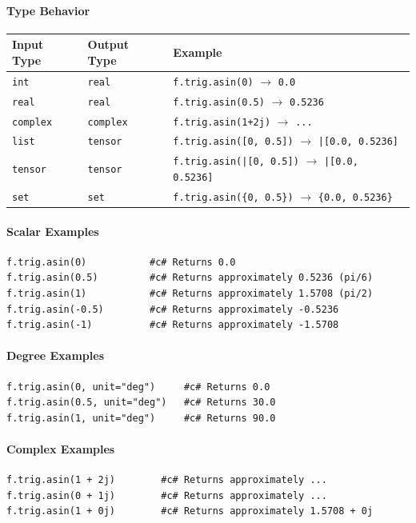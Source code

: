 \paragraph{Type Behavior}
\begin{center}
\begin{tabular}{lll}
\textbf{Input Type} & \textbf{Output Type} & \textbf{Example} \\ \hline
\texttt{int} & \texttt{real} & \texttt{f.trig.asin(0)} $\to$ \texttt{0.0} \\
\texttt{real} & \texttt{real} & \texttt{f.trig.asin(0.5)} $\to$ \texttt{0.5236} \\
\texttt{complex} & \texttt{complex} & \texttt{f.trig.asin(1+2j)} $\to$ \texttt{...} \\
\texttt{list} & \texttt{tensor} & \texttt{f.trig.asin([0, 0.5])} $\to$ \texttt{|[0.0, 0.5236]} \\
\texttt{tensor} & \texttt{tensor} & \texttt{f.trig.asin(|[0, 0.5])} $\to$ \texttt{|[0.0, 0.5236]} \\
\texttt{set} & \texttt{set} & \texttt{f.trig.asin(\{0, 0.5\})} $\to$ \texttt{\{0.0, 0.5236\}} \\
\end{tabular}
\end{center}

\paragraph{Scalar Examples}
\begin{verbatim}
f.trig.asin(0)           #c# Returns 0.0
f.trig.asin(0.5)         #c# Returns approximately 0.5236 (pi/6)
f.trig.asin(1)           #c# Returns approximately 1.5708 (pi/2)
f.trig.asin(-0.5)        #c# Returns approximately -0.5236
f.trig.asin(-1)          #c# Returns approximately -1.5708
\end{verbatim}

\paragraph{Degree Examples}
\begin{verbatim}
f.trig.asin(0, unit="deg")     #c# Returns 0.0
f.trig.asin(0.5, unit="deg")   #c# Returns 30.0
f.trig.asin(1, unit="deg")     #c# Returns 90.0
\end{verbatim}

\paragraph{Complex Examples}
\begin{verbatim}
f.trig.asin(1 + 2j)        #c# Returns approximately ...
f.trig.asin(0 + 1j)        #c# Returns approximately ...
f.trig.asin(1 + 0j)        #c# Returns approximately 1.5708 + 0j
\end{verbatim}

